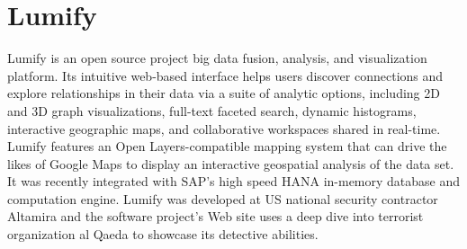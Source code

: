 \section{Lumify}
Lumify is an open source project big data fusion, analysis, and visualization platform. Its intuitive web-based interface helps users discover connections and explore relationships in their data via a suite of analytic options, including 2D and 3D graph visualizations, full-text faceted search, dynamic histograms, interactive geographic maps, and collaborative workspaces shared in real-time.\cite{lumify-web} Lumify features an Open Layers-compatible mapping system that can drive the likes of Google Maps to display an interactive geospatial analysis of the data set. It was recently integrated with SAP’s high speed HANA in-memory database and computation engine. Lumify was developed at US national security contractor Altamira and the software project’s Web site uses a deep dive into terrorist organization al Qaeda to showcase its detective abilities.\cite{lumify-linkedin}
 

